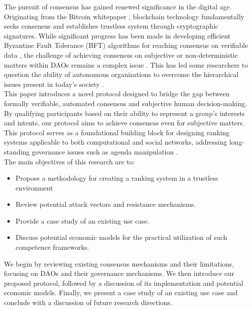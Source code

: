 \documentclass{article}
\begin{document}
\begin{CJK}{UTF8}{gbsn}
\begin{multicols}{2}
        The pursuit of consensus has gained renewed significance in the digital age. Originating from the Bitcoin whitepaper \cite{Satoshi}, blockchain technology fundamentally seeks consensus and establishes trustless system through cryptographic signatures. While significant progress has been made in developing efficient Byzantine Fault Tolerance (BFT) algorithms for reaching consensus on verifiable data \cite{Genrui2023}, the challenge of achieving consensus on subjective or non-deterministic matters within DAOs \cite{Hassan2021} remains a complex issue \cite{Shuai2019}\cite{Rainer2023}. This has led some researchers to question the ability of autonomous organizations to overcome the hierarchical issues present in today's society \cite{Marcella2016}\cite{Xuan2024}.   \\
        This paper introduces a novel protocol designed to bridge the gap between formally verifiable, automated consensus and subjective human decision-making. By qualifying participants based on their ability to represent a group's interests and intents, our protocol aims to achieve consensus even for subjective matters. This protocol serves as a foundational building block for designing ranking systems applicable to both computational and social networks, addressing long-standing governance issues such as agenda manipulation  \cite{McKelvey1976}.\\
        The main objectives of this research are to:

        \begin{itemize}[nosep]
            \item Propose a methodology for creating a ranking system in a trustless environment
            \item Review potential attack vectors and resistance mechanisms.
            \item Provide a case study of an existing use case.
            \item Discuss potential economic models for the practical utilization of such competence frameworks.
        \end{itemize}
        We begin by reviewing existing consensus mechanisms and their limitations, focusing on DAOs and their governance mechanisms. We then introduce our proposed protocol, followed by a discussion of its implementation and potential economic models. Finally, we present a case study of an existing use case and conclude with a discussion of future research directions.


\end{multicols}
\end{CJK}
\end{document}
